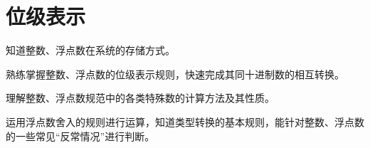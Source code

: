 \chapter{位级表示}
	\begin{summary}
		\begin{compactitem}
			\item 知道整数、浮点数在系统的存储方式。
			\item 熟练掌握整数、浮点数的位级表示规则，快速完成其同十进制数的相互转换。
			\item 理解整数、浮点数规范中的各类特殊数的计算方法及其性质。
			\item 运用浮点数舍入的规则进行运算，知道类型转换的基本规则，能针对整数、浮点数的一些常见“反常情况”进行判断。
		\end{compactitem}
	\end{summary}

